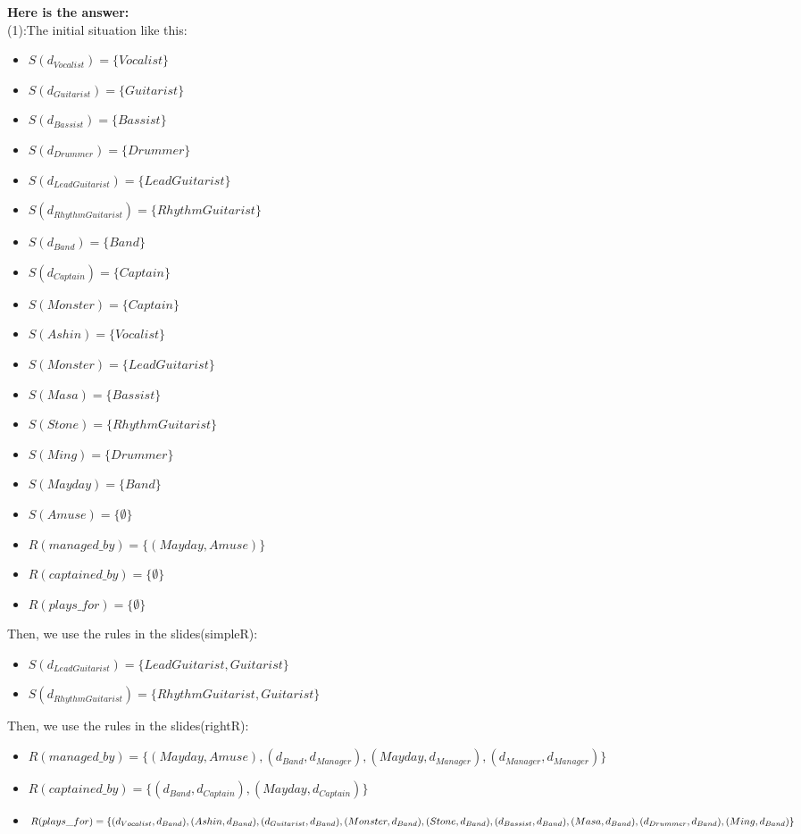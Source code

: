 \documentclass{article}
\begin{document}
    \textbf{Here is the answer:}\\
    (1):The initial situation like this:
    \begin{itemize}
        \item $S(d_{Vocalist}) = \{Vocalist\}$
        \item $S(d_{Guitarist}) = \{Guitarist\}$
        \item $S(d_{Bassist}) = \{Bassist\}$
        \item $S(d_{Drummer}) = \{Drummer\}$
        \item $S(d_{LeadGuitarist}) = \{LeadGuitarist\}$
        \item $S(d_{RhythmGuitarist}) = \{RhythmGuitarist\}$
        \item $S(d_{Band}) = \{Band\}$
        \item $S(d_{Captain}) = \{Captain\}$
        \item $S(Monster) = \{Captain\}$
        \item $S(Ashin) = \{Vocalist\}$
        \item $S(Monster) = \{LeadGuitarist\}$
        \item $S(Masa) = \{Bassist\}$
        \item $S(Stone) = \{RhythmGuitarist\}$
        \item $S(Ming) = \{Drummer\}$
        \item $S(Mayday) = \{Band\}$
        \item $S(Amuse) = \{\emptyset\}$
        \item $R(managed\_by) = \{(Mayday, Amuse)\}$
        \item $R(captained\_by) = \{\emptyset\}$
        \item $R(plays\_for) = \{\emptyset\}$
    \end{itemize}
    
    Then, we use the rules in the slides(simpleR):\\
    \begin{itemize}
        \item $S(d_{LeadGuitarist}) = \{LeadGuitarist, Guitarist\}$
        \item $S(d_{RhythmGuitarist}) = \{RhythmGuitarist, Guitarist\}$
    \end{itemize}
    
    Then, we use the rules in the slides(rightR):\\
    \begin{itemize}
        \item $R(managed\_by) = \{(Mayday, Amuse), (d_{Band}, d_{Manager}), (Mayday, d_{Manager}), (d_{Manager}, d_{Manager})\}$
        \item $R(captained\_by) = \{(d_{Band}, d_{Captain}), (Mayday, d_{Captain})\}$
        \item $R(plays\_for) = \{(d_{Vocalist}, d_{Band}), (Ashin, d_{Band}), (d_{Guitarist}, d_{Band}), (Monster, d_{Band}), \\
        (Stone, d_{Band}), (d_{Bassist}, d_{Band}), (Masa, d_{Band}), (d_{Drummer}, d_{Band}), (Ming, d_{Band})\}$
    \end{itemize}
    
\end{document}
